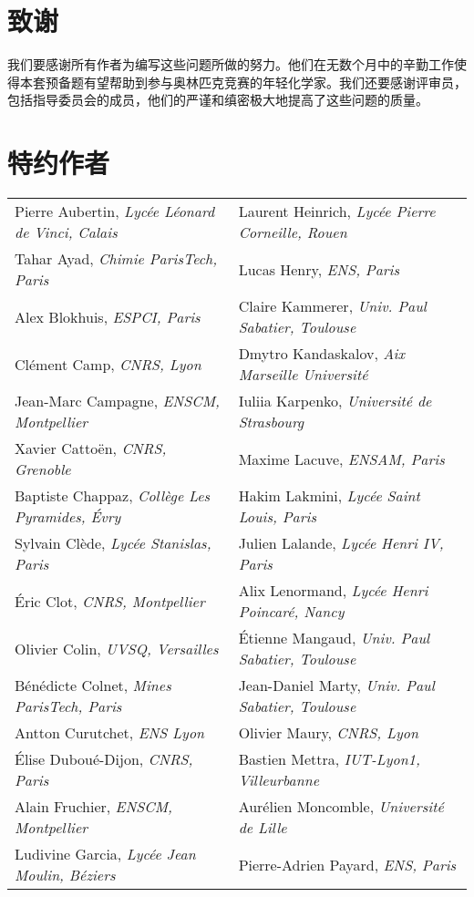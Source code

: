 \documentclass[10.5pt]{report}
\newcommand{\mysection}[1]{
	\section*{#1}
	\addcontentsline{toc}{section}{#1}
}%
\begin{document}
\section*{致谢}
我们要感谢所有作者为编写这些问题所做的努力。他们在无数个月中的辛勤工作使得本套预备题有望帮助到参与奥林匹克竞赛的年轻化学家。我们还要感谢评审员，包括指导委员会的成员，他们的严谨和缜密极大地提高了这些问题的质量。
\newpage

\mysection{特约作者}
{\footnotesize
\begin{longtable}{ p{7cm}p{7cm}}  %
	Pierre Aubertin, \textit{Lycée Léonard de Vinci, Calais} &Laurent Heinrich, \textit{Lycée Pierre Corneille, Rouen}\\
	Tahar Ayad, \textit{Chimie ParisTech, Paris}&Lucas Henry, \textit{ENS, Paris}\\
	Alex Blokhuis, \textit{ESPCI, Paris}&Claire Kammerer, \textit{Univ. Paul Sabatier, Toulouse}\\
	Clément Camp, \textit{CNRS, Lyon}&Dmytro Kandaskalov, \textit{Aix Marseille Université}\\
	Jean-Marc Campagne, \textit{ENSCM, Montpellier}&Iuliia Karpenko, \textit{Université de Strasbourg}\\
	Xavier Cattoën, \textit{CNRS, Grenoble}&Maxime Lacuve, \textit{ENSAM, Paris}\\
	Baptiste Chappaz, \textit{Collège Les Pyramides, Évry}&Hakim Lakmini, \textit{Lycée Saint Louis, Paris}\\
	Sylvain Clède, \textit{Lycée Stanislas, Paris}&Julien Lalande, \textit{Lycée Henri IV, Paris}\\
	Éric Clot, \textit{CNRS, Montpellier}&Alix Lenormand, \textit{Lycée Henri Poincaré, Nancy}\\
	Olivier Colin, \textit{UVSQ, Versailles}&Étienne Mangaud, \textit{Univ. Paul Sabatier, Toulouse}\\
	Bénédicte Colnet, \textit{Mines ParisTech, Paris}&Jean-Daniel Marty, \textit{Univ. Paul Sabatier, Toulouse}\\
	Antton Curutchet, \textit{ENS Lyon}&Olivier Maury, \textit{CNRS, Lyon}\\
	Élise Duboué-Dijon, \textit{CNRS, Paris}&Bastien Mettra, \textit{IUT-Lyon1, Villeurbanne}\\
	Alain Fruchier, \textit{ENSCM, Montpellier}&Aurélien Moncomble, \textit{Université de Lille}\\
	Ludivine Garcia, \textit{Lycée Jean Moulin, Béziers}&Pierre-Adrien Payard, \textit{ENS, Paris}\\

\end{longtable}}
\end{document}
